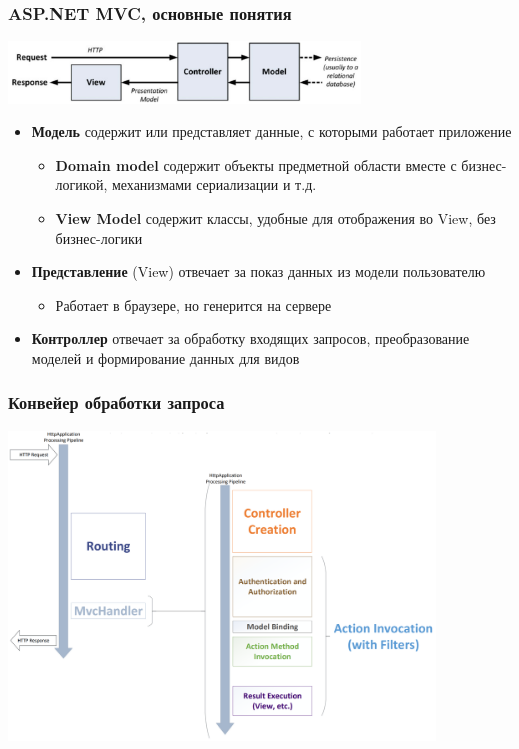 \documentclass{../../slides-style}
\begin{document}
    \begin{frame}
        \frametitle{ASP.NET MVC, основные понятия}
        \begin{center}
            \includegraphics[width=0.7\textwidth]{mvc.png}
        \end{center}

        \vspace{-5mm}

        \begin{itemize}
            \item \textbf{Модель} содержит или представляет данные, с которыми работает приложение
            \begin{itemize}
                \item \textbf{Domain model} содержит объекты предметной области вместе с бизнес-логикой, механизмами сериализации и т.д.
                \item \textbf{View Model} содержит классы, удобные для отображения во View, без бизнес-логики
            \end{itemize}
            \item \textbf{Представление} (View) отвечает за показ данных из модели пользователю
            \begin{itemize}
                \item Работает в браузере, но генерится на сервере
            \end{itemize}
            \item \textbf{Контроллер} отвечает за обработку входящих запросов, преобразование моделей и формирование данных для видов
        \end{itemize}
    \end{frame}

    \begin{frame}
        \frametitle{Конвейер обработки запроса}
        \begin{center}
            \includegraphics[width=0.85\textwidth]{requestLifecycle.png}
            \vspace{-5mm}
        \end{center}
    \end{frame}
\end{document}
